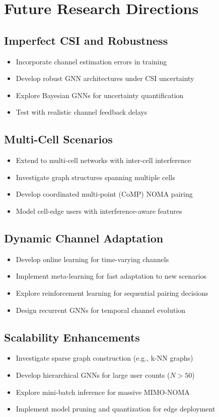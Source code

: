 \section{Future Research Directions}

\subsection{Imperfect CSI and Robustness}
\begin{itemize}
    \item Incorporate channel estimation errors in training
    \item Develop robust GNN architectures under CSI uncertainty
    \item Explore Bayesian GNNs for uncertainty quantification
    \item Test with realistic channel feedback delays
\end{itemize}

\subsection{Multi-Cell Scenarios}
\begin{itemize}
    \item Extend to multi-cell networks with inter-cell interference
    \item Investigate graph structures spanning multiple cells
    \item Develop coordinated multi-point (CoMP) NOMA pairing
    \item Model cell-edge users with interference-aware features
\end{itemize}

\subsection{Dynamic Channel Adaptation}
\begin{itemize}
    \item Develop online learning for time-varying channels
    \item Implement meta-learning for fast adaptation to new scenarios
    \item Explore reinforcement learning for sequential pairing decisions
    \item Design recurrent GNNs for temporal channel evolution
\end{itemize}

\subsection{Scalability Enhancements}
\begin{itemize}
    \item Investigate sparse graph construction (e.g., k-NN graphs)
    \item Develop hierarchical GNNs for large user counts ($N > 50$)
    \item Explore mini-batch inference for massive MIMO-NOMA
    \item Implement model pruning and quantization for edge deployment
\end{itemize}


